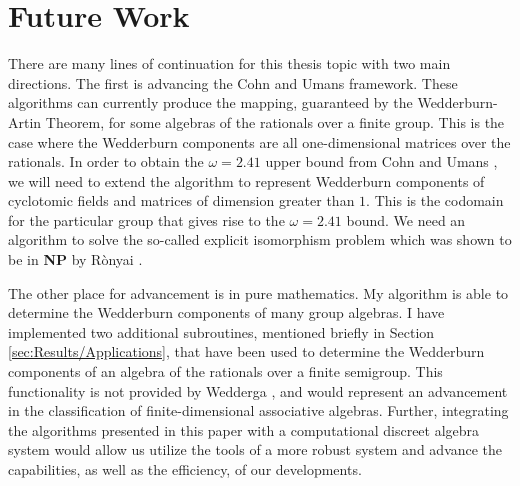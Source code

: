 \documentclass[../thesis.tex]{subfiles}
\begin{document}
\section{Future Work}\label{sec:FutureWork}
There are many lines of continuation for this thesis topic with two main directions. The first is advancing the Cohn and Umans framework. These algorithms can currently produce the mapping, guaranteed by the Wedderburn-Artin Theorem, for some algebras of the rationals over a finite group. This is the case where the Wedderburn components are all one-dimensional matrices over the rationals. In order to obtain the $\omega=2.41$ upper bound from Cohn and Umans \cite{CohnNew}, we will need to extend the algorithm to represent Wedderburn components of cyclotomic fields and matrices of dimension greater than $1.$ This is the codomain for the particular group that gives rise to the $\omega=2.41$ bound. We need an algorithm to solve the so-called explicit isomorphism problem which was shown to be in \textbf{NP} by R\`onyai \cite{SimpleAlgebrasAreDifficult}.

The other place for advancement is in pure mathematics. My algorithm is able to determine the Wedderburn components of many group algebras. I have implemented two additional subroutines, mentioned briefly in Section \ref{sec:Results/Applications}, that have been used to determine the Wedderburn components of an algebra of the rationals over a finite semigroup. This functionality is not provided by Wedderga \cite{wedderga}, and would represent an advancement in the classification of finite-dimensional associative algebras. Further, integrating the algorithms presented in this paper with a computational discreet algebra system would allow us utilize the tools of a more robust system and advance the capabilities, as well as the efficiency, of our developments.
\end{document}
